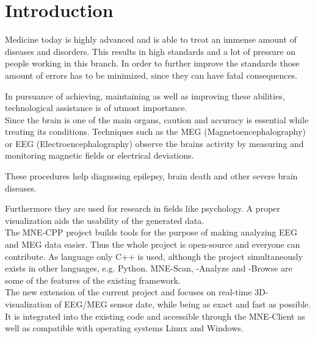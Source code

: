 
\section{Introduction}

	Medicine today is highly advanced and is able to treat an immense amount of diseases and disorders.
	This results in high standards and a lot of pressure on people working in this branch. In order to further improve the standards those amount of errors has to be 		minimized, since they can have fatal consequences.

	In pursuance of achieving, maintaining as well as improving these abilities, technological assistance is of utmost importance.\\  

	Since the brain is one of the main organs, caution and accuracy is essential while treating its conditions. 
	Techniques such as the MEG (Magnetoencephalography) or EEG (Electroencephalography) observe the brains activity by 				measuring and monitoring magnetic fields or electrical deviations.

	These procedures help diagnosing epilepsy, brain death and other severe brain diseases.

	Furthermore they are used for research in fields like psychology.
	A proper visualization aids the usability of the generated data. \\

	The MNE-CPP  project builds tools for the purpose of making analyzing EEG and MEG data easier.
	Thus the whole project is open-source and everyone can contribute. As language only C++ is used, although the project 			simultaneously exists in other languages, e.g. Python. %
	MNE-Scan, -Analyze and -Browse are some of the features of the existing framework. \\

	The new extension of the current project and focuses on real-time 3D-visualization of EEG/MEG sensor date, while being as 		exact and fast as possible. It is integrated into the existing code and accessible through the MNE-Client as well as 			compatible with operating systems Linux and Windows.
  
